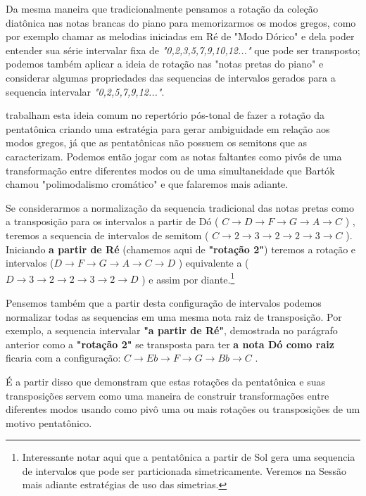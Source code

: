 \documentclass[
	12pt,				%
	openright,			%
	twoside,			%
	a4paper,			%
	english,			%
	french,				%
	spanish,			%
	brazil				%
	]{abntex2}
\begin{document}
Da mesma maneira que tradicionalmente pensamos a rotação da coleção diatônica nas notas brancas do piano para memorizarmos os modos gregos, como por exemplo chamar as melodias iniciadas em Ré de "Modo Dórico" e dela poder entender sua série intervalar fixa de \textit{"0,2,3,5,7,9,10,12..."} que pode ser transposto; podemos também aplicar a ideia de rotação nas "notas pretas do piano" e considerar algumas propriedades das sequencias de intervalos gerados para a sequencia intervalar \textit{"0,2,5,7,9,12..."}.

 trabalham esta ideia comum no repertório pós-tonal de fazer a rotação da pentatônica criando uma estratégia para gerar ambiguidade em relação aos modos gregos, já que as pentatônicas não possuem os semitons que as caracterizam. Podemos então jogar com as notas faltantes como pivôs de uma transformação entre diferentes modos ou de uma simultaneidade que Bartók chamou "polimodalismo cromático" e que falaremos mais adiante. 

Se considerarmos a normalização da sequencia tradicional das notas pretas como a transposição para os intervalos a partir de Dó ( $C \rightarrow  D \rightarrow F \rightarrow G \rightarrow A \rightarrow C $ ) , teremos a sequencia de intervalos de semitom ( $C \rightarrow 2 \rightarrow  3 \rightarrow 2 \rightarrow 2  \rightarrow 3 \rightarrow C $ ). Iniciando \textbf{a partir de Ré} (chamemos aqui de \textbf{"rotação 2"}) teremos a rotação e intervalos ($D \rightarrow F \rightarrow G \rightarrow A \rightarrow C \rightarrow D $ ) equivalente a ( $  D \rightarrow 3 \rightarrow  2 \rightarrow 2 \rightarrow 3  \rightarrow 2 \rightarrow D $ ) e assim por diante.\footnote{Interessante notar aqui que a pentatônica a partir de Sol gera uma sequencia de intervalos que pode ser particionada simetricamente. Veremos na Sessão mais adiante estratégias de uso das simetrias.}

Pensemos também que a partir desta configuração de intervalos podemos normalizar todas as sequencias em uma mesma nota raiz de transposição. Por exemplo, a sequencia intervalar \textbf{"a partir de Ré"}, demostrada no parágrafo anterior como a \textbf{"rotação 2"} se transposta para ter \textbf{a nota Dó como raiz} ficaria com a configuração: $C \rightarrow Eb \rightarrow F \rightarrow G \rightarrow Bb \rightarrow C $ .

É a partir disso que  demonstram que estas rotações da pentatônica e suas transposições servem como uma maneira de construir transformações entre diferentes modos usando como pivô uma ou mais rotações ou transposições de um motivo pentatônico. 
\end{document}
